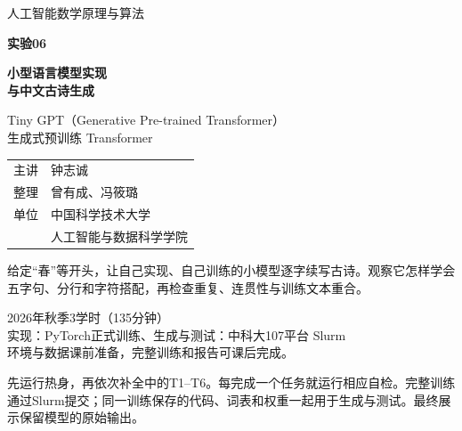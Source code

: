 \documentclass[UTF8,a4paper,11pt,fontset=fandol]{ctexart}
\newcommand{\file}[1]{\allowbreak\texttt{\detokenize{#1}}}
\begin{document}
\hypersetup{pageanchor=false}
\begin{titlepage}\thispagestyle{empty}
\setlength{\parindent}{0pt}
\vspace*{.8cm}
{\Large\color{white}人工智能数学原理与算法\par}
\vspace{.8cm}
{\fontsize{34}{43}\selectfont\bfseries\color{white}实验06\par}
\vspace{.3cm}
{\fontsize{25}{34}\selectfont\bfseries\color{white}小型语言模型实现\\与中文古诗生成\par}
\vspace{.6cm}
{\large\color{white}Tiny GPT（Generative Pre-trained Transformer）\\生成式预训练 Transformer\par}
\vspace{1.8cm}
\begin{tabular}{@{}ll}
主讲 & 钟志诚\\[.6em]
整理 & 曾有成、冯筱璐\\[.6em]
单位 & 中国科学技术大学\\
 & 人工智能与数据科学学院
\end{tabular}
\vspace{.7cm}
\begin{keybox}[本次要完成的作品]
给定“春”等开头，让自己实现、自己训练的小模型逐字续写古诗。观察它怎样学会五字句、分行和字符搭配，再检查重复、连贯性与训练文本重合。
\end{keybox}
\vfill
2026年秋季\quad 3学时（135分钟）\\
实现：PyTorch\quad 正式训练、生成与测试：中科大107平台 Slurm\\
环境与数据课前准备，完整训练和报告可课后完成。
\end{titlepage}
\hypersetup{pageanchor=true}
\tableofcontents
\vfill
\begin{teacherbox}[如何使用]
先运行热身，再依次补全\file{code/student.py}中的T1--T6。每完成一个任务就运行相应自检。完整训练通过Slurm提交；同一训练保存的代码、词表和权重一起用于生成与测试。最终展示保留模型的原始输出。
\end{teacherbox}
\clearpage{}
\end{document}
